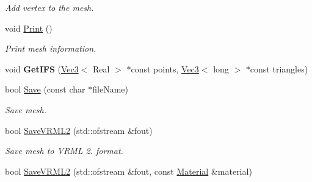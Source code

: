 \begin{DoxyCompactItemize}
\begin{DoxyCompactList}\small\item\em Add vertex to the mesh. \end{DoxyCompactList}\item 
\hypertarget{class_h_a_c_d_1_1_t_m_mesh_a57f36e6eb0e93243786d67e85b6058cb}{void \hyperlink{class_h_a_c_d_1_1_t_m_mesh_a57f36e6eb0e93243786d67e85b6058cb}{Print} ()}\label{class_h_a_c_d_1_1_t_m_mesh_a57f36e6eb0e93243786d67e85b6058cb}

\begin{DoxyCompactList}\small\item\em Print mesh information. \end{DoxyCompactList}\item 
\hypertarget{class_h_a_c_d_1_1_t_m_mesh_abea91176ce2f7cd7e10506b23ba6041e}{void {\bfseries Get\+I\+F\+S} (\hyperlink{class_h_a_c_d_1_1_vec3}{Vec3}$<$ Real $>$ $\ast$const points, \hyperlink{class_h_a_c_d_1_1_vec3}{Vec3}$<$ long $>$ $\ast$const triangles)}\label{class_h_a_c_d_1_1_t_m_mesh_abea91176ce2f7cd7e10506b23ba6041e}

\item 
\hypertarget{class_h_a_c_d_1_1_t_m_mesh_a2318fa3cab32430032351dedb71837c6}{bool \hyperlink{class_h_a_c_d_1_1_t_m_mesh_a2318fa3cab32430032351dedb71837c6}{Save} (const char $\ast$file\+Name)}\label{class_h_a_c_d_1_1_t_m_mesh_a2318fa3cab32430032351dedb71837c6}

\begin{DoxyCompactList}\small\item\em Save mesh. \end{DoxyCompactList}\item 
\hypertarget{class_h_a_c_d_1_1_t_m_mesh_a8c0a261c9d3ec3a96039efbcdcf0eac0}{bool \hyperlink{class_h_a_c_d_1_1_t_m_mesh_a8c0a261c9d3ec3a96039efbcdcf0eac0}{Save\+V\+R\+M\+L2} (std\+::ofstream \&fout)}\label{class_h_a_c_d_1_1_t_m_mesh_a8c0a261c9d3ec3a96039efbcdcf0eac0}

\begin{DoxyCompactList}\small\item\em Save mesh to V\+R\+M\+L 2. format. \end{DoxyCompactList}\item 
\hypertarget{class_h_a_c_d_1_1_t_m_mesh_a1a671c752f69e7f894c815bad11f8948}{bool \hyperlink{class_h_a_c_d_1_1_t_m_mesh_a1a671c752f69e7f894c815bad11f8948}{Save\+V\+R\+M\+L2} (std\+::ofstream \&fout, const \hyperlink{class_h_a_c_d_1_1_material}{Material} \&material)}\label{class_h_a_c_d_1_1_t_m_mesh_a1a671c752f69e7f894c815bad11f8948}


\end{DoxyCompactItemize}
